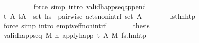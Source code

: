 \begin{isabellebody}
\ \ \ \ \ \ \ \ \isamarkupfalse%
\ {\isacharparenleft}{\kern0pt}force\ simp{\isacharcolon}{\kern0pt}\ intro{\isacharbang}{\kern0pt}{\isacharcolon}{\kern0pt}\ valid{\isacharunderscore}{\kern0pt}happ{\isacharunderscore}{\kern0pt}seq{\isacharunderscore}{\kern0pt}append{\isacharunderscore}{\kern0pt}{}{\isacharparenright}{\kern0pt}\isanewline
\ \ \ \ \isamarkupfalse%
\isanewline
\ \ \ \ \isamarkupfalse%
\ \isamarkupfalse%
\ {\isachardoublequoteopen}{\isasymAnd}t{\isacharprime}{\kern0pt}{\isacharprime}{\kern0pt}\ A{\isacharprime}{\kern0pt}{\isacharprime}{\kern0pt}{\isachardot}{\kern0pt}\ {\isacharparenleft}{\kern0pt}t{\isacharprime}{\kern0pt}{\isacharprime}{\kern0pt}{\isacharcomma}{\kern0pt}A{\isacharprime}{\kern0pt}{\isacharprime}{\kern0pt}{\isacharparenright}{\kern0pt}\ {\isasymin}\ set\ hs{}{\isacharprime}{\kern0pt}\ {\isasymLongrightarrow}\ pairwise\ acts{\isacharunderscore}{\kern0pt}non{\isacharunderscore}{\kern0pt}intrf\ {\isacharparenleft}{\kern0pt}set\ A{\isacharprime}{\kern0pt}{\isacharprime}{\kern0pt}{\isacharparenright}{\kern0pt}{\isachardoublequoteclose}\isanewline
\ \ \ \ \ \ \isamarkupfalse%
\ fst{\isacharunderscore}{\kern0pt}h{}{\isacharprime}{\kern0pt}{\isacharunderscore}{\kern0pt}n{\isacharunderscore}{\kern0pt}htp\ {}{\isacharparenleft}{\kern0pt}{}{}{\isacharparenright}{\kern0pt}\isanewline
\ \ \ \ \ \ \isamarkupfalse%
\ {\isacharparenleft}{\kern0pt}force\ simp{\isacharcolon}{\kern0pt}\ intro{\isacharbang}{\kern0pt}{\isacharcolon}{\kern0pt}\ empty{\isacharunderscore}{\kern0pt}eff{\isacharunderscore}{\kern0pt}non{\isacharunderscore}{\kern0pt}intrf{\isacharparenright}{\kern0pt}\isanewline
\ \ \ \ \isamarkupfalse%
\ \isamarkupfalse%
\ {\isacharquery}{\kern0pt}thesis\isanewline
\ \ \ \ \ \ \isamarkupfalse%
\ {\isacartoucheopen}valid{\isacharunderscore}{\kern0pt}happ{\isacharunderscore}{\kern0pt}seq\ M\ {\isacharbrackleft}{\kern0pt}h{\isacharprime}{\kern0pt}{\isacharbrackright}{\kern0pt}\ {\isacharparenleft}{\kern0pt}apply{\isacharunderscore}{\kern0pt}happ\ {\isacharparenleft}{\kern0pt}t{\isacharcomma}{\kern0pt}\ A{\isacharprime}{\kern0pt}{\isacharparenright}{\kern0pt}\ M{\isacharparenright}{\kern0pt}{\isacartoucheclose}\ fst{\isacharunderscore}{\kern0pt}h{}{\isacharprime}{\kern0pt}{\isacharunderscore}{\kern0pt}n{\isacharunderscore}{\kern0pt}htp\isanewline
\ \ \ \ \ \ \isamarkupfalse%

\end{isabellebody}

